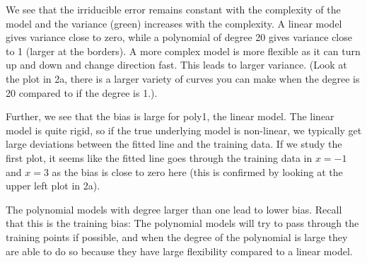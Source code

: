 \documentclass[]{article}
\begin{document}
We see that the irriducible error remains constant with the complexity
of the model and the variance (green) increases with the complexity. A
linear model gives variance close to zero, while a polynomial of degree
20 gives variance close to 1 (larger at the borders). A more complex
model is more flexible as it can turn up and down and change direction
fast. This leads to larger variance. (Look at the plot in 2a, there is a
larger variety of curves you can make when the degree is 20 compared to
if the degree is 1.).

Further, we see that the bias is large for poly1, the linear model. The
linear model is quite rigid, so if the true underlying model is
non-linear, we typically get large deviations between the fitted line
and the training data. If we study the first plot, it seems like the
fitted line goes through the training data in \(x=-1\) and \(x=3\) as
the bias is close to zero here (this is confirmed by looking at the
upper left plot in 2a).

The polynomial models with degree larger than one lead to lower bias.
Recall that this is the training bias: The polynomial models will try to
pass through the training points if possible, and when the degree of the
polynomial is large they are able to do so because they have large
flexibility compared to a linear model.
\end{document}
